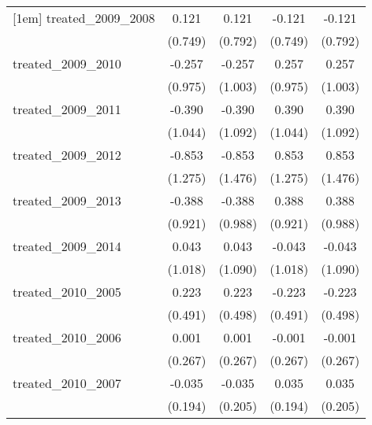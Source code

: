 {\begin{tabular}{l*{4}{c}}
[1em]
treated\_2009\_2008&       0.121         &       0.121         &      -0.121         &      -0.121         \\
            &     (0.749)         &     (0.792)         &     (0.749)         &     (0.792)         \\
[1em]
treated\_2009\_2010&      -0.257         &      -0.257         &       0.257         &       0.257         \\
            &     (0.975)         &     (1.003)         &     (0.975)         &     (1.003)         \\
[1em]
treated\_2009\_2011&      -0.390         &      -0.390         &       0.390         &       0.390         \\
            &     (1.044)         &     (1.092)         &     (1.044)         &     (1.092)         \\
[1em]
treated\_2009\_2012&      -0.853         &      -0.853         &       0.853         &       0.853         \\
            &     (1.275)         &     (1.476)         &     (1.275)         &     (1.476)         \\
[1em]
treated\_2009\_2013&      -0.388         &      -0.388         &       0.388         &       0.388         \\
            &     (0.921)         &     (0.988)         &     (0.921)         &     (0.988)         \\
[1em]
treated\_2009\_2014&       0.043         &       0.043         &      -0.043         &      -0.043         \\
            &     (1.018)         &     (1.090)         &     (1.018)         &     (1.090)         \\
[1em]
treated\_2010\_2005&       0.223         &       0.223         &      -0.223         &      -0.223         \\
            &     (0.491)         &     (0.498)         &     (0.491)         &     (0.498)         \\
[1em]
treated\_2010\_2006&       0.001         &       0.001         &      -0.001         &      -0.001         \\
            &     (0.267)         &     (0.267)         &     (0.267)         &     (0.267)         \\
[1em]
treated\_2010\_2007&      -0.035         &      -0.035         &       0.035         &       0.035         \\
            &     (0.194)         &     (0.205)         &     (0.194)         &     (0.205)         \\

\end{tabular}}

